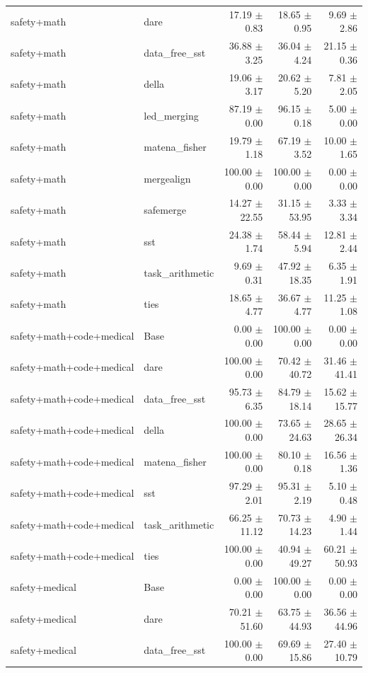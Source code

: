 \documentclass{article}
\begin{document}
\begin{table}[H]
{\begin{tabular}{llrrr}
safety+math & dare & 17.19 $\pm$ 0.83 & 18.65 $\pm$ 0.95 & 9.69 $\pm$ 2.86 \\
safety+math & data\_free\_sst & 36.88 $\pm$ 3.25 & 36.04 $\pm$ 4.24 & 21.15 $\pm$ 0.36 \\
safety+math & della & 19.06 $\pm$ 3.17 & 20.62 $\pm$ 5.20 & 7.81 $\pm$ 2.05 \\
safety+math & led\_merging & 87.19 $\pm$ 0.00 & 96.15 $\pm$ 0.18 & 5.00 $\pm$ 0.00 \\
safety+math & matena\_fisher & 19.79 $\pm$ 1.18 & 67.19 $\pm$ 3.52 & 10.00 $\pm$ 1.65 \\
safety+math & mergealign & 100.00 $\pm$ 0.00 & 100.00 $\pm$ 0.00 & 0.00 $\pm$ 0.00 \\
safety+math & safemerge & 14.27 $\pm$ 22.55 & 31.15 $\pm$ 53.95 & 3.33 $\pm$ 3.34 \\
safety+math & sst & 24.38 $\pm$ 1.74 & 58.44 $\pm$ 5.94 & 12.81 $\pm$ 2.44 \\
safety+math & task\_arithmetic & 9.69 $\pm$ 0.31 & 47.92 $\pm$ 18.35 & 6.35 $\pm$ 1.91 \\
safety+math & ties & 18.65 $\pm$ 4.77 & 36.67 $\pm$ 4.77 & 11.25 $\pm$ 1.08 \\
safety+math+code+medical & Base & 0.00 $\pm$ 0.00 & 100.00 $\pm$ 0.00 & 0.00 $\pm$ 0.00 \\
safety+math+code+medical & dare & 100.00 $\pm$ 0.00 & 70.42 $\pm$ 40.72 & 31.46 $\pm$ 41.41 \\
safety+math+code+medical & data\_free\_sst & 95.73 $\pm$ 6.35 & 84.79 $\pm$ 18.14 & 15.62 $\pm$ 15.77 \\
safety+math+code+medical & della & 100.00 $\pm$ 0.00 & 73.65 $\pm$ 24.63 & 28.65 $\pm$ 26.34 \\
safety+math+code+medical & matena\_fisher & 100.00 $\pm$ 0.00 & 80.10 $\pm$ 0.18 & 16.56 $\pm$ 1.36 \\
safety+math+code+medical & sst & 97.29 $\pm$ 2.01 & 95.31 $\pm$ 2.19 & 5.10 $\pm$ 0.48 \\
safety+math+code+medical & task\_arithmetic & 66.25 $\pm$ 11.12 & 70.73 $\pm$ 14.23 & 4.90 $\pm$ 1.44 \\
safety+math+code+medical & ties & 100.00 $\pm$ 0.00 & 40.94 $\pm$ 49.27 & 60.21 $\pm$ 50.93 \\
safety+medical & Base & 0.00 $\pm$ 0.00 & 100.00 $\pm$ 0.00 & 0.00 $\pm$ 0.00 \\
safety+medical & dare & 70.21 $\pm$ 51.60 & 63.75 $\pm$ 44.93 & 36.56 $\pm$ 44.96 \\
safety+medical & data\_free\_sst & 100.00 $\pm$ 0.00 & 69.69 $\pm$ 15.86 & 27.40 $\pm$ 10.79 \\

\end{tabular}}
\end{table}
\end{document}
